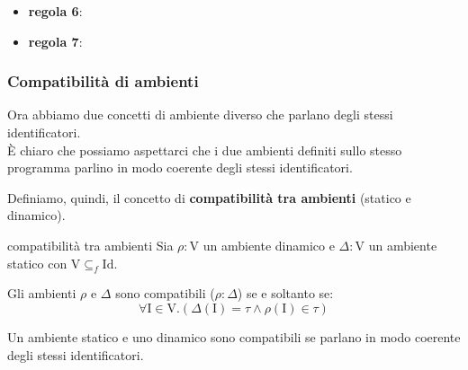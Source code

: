 \begin{itemize}[label=$\triangleright$, itemsep=\medskipamount]
{\[\begin{prooftree}
                \infer1{\textcolor{red}{\Delta \vdash_\mathrm{V}} \mathrm{e}_1 \texttt{ or } \mathrm{e}_2 : \texttt{bool}}
            \end{prooftree}
            \quad \texttt{op} \in \{+,-,*\}
        \]
    }
    \item \textbf{regola 6}:
    \item \textbf{regola 7}:
\end{itemize}

\subsubsection{Compatibilità di ambienti}
Ora abbiamo due concetti di ambiente diverso che parlano degli stessi identificatori.\\[0.2ex]
È chiaro che possiamo aspettarci che i due ambienti definiti sullo stesso programma parlino in modo coerente degli stessi identificatori.

\smallskip
Definiamo, quindi, il concetto di \textbf{compatibilità tra ambienti} (statico e dinamico).
\begin{mydef}{compatibilità tra ambienti}
    Sia $\rho : \mathrm{V}$ un ambiente dinamico e $\Delta : \mathrm{V}$ un ambiente statico con $\mathrm{V} \subseteq_f \mathrm{Id}$.

    Gli ambienti $\rho$ e $\Delta$ sono compatibili ($\rho : \Delta$) se e soltanto se:
    \[
        \forall \mathrm{I} \in \mathrm{V}.(\Delta(\mathrm{I}) = \tau \land \rho(\mathrm{I}) \in \tau)
    \]
\end{mydef}

Un ambiente statico e uno dinamico sono compatibili se parlano in modo coerente degli stessi identificatori.